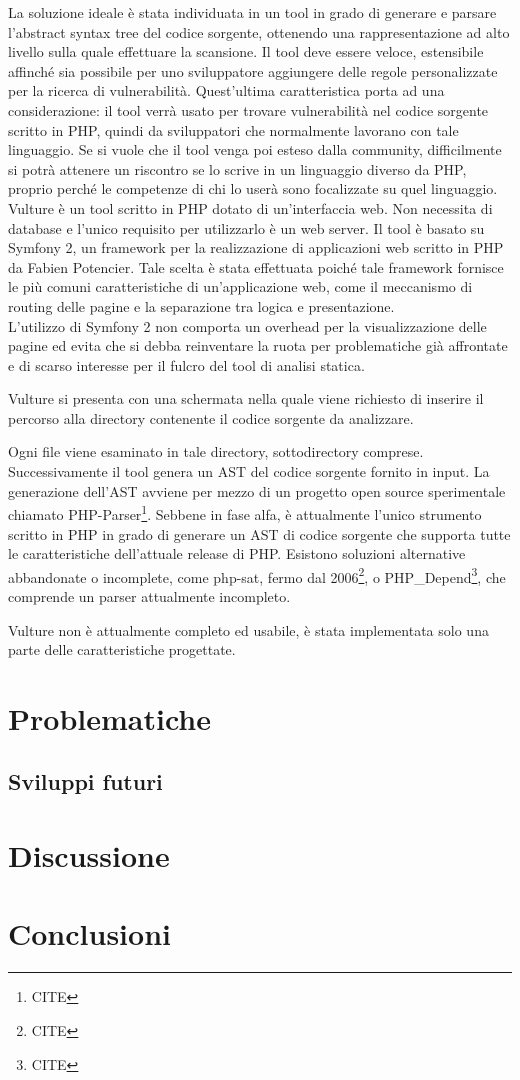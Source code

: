 La soluzione ideale è stata individuata in un tool in grado di generare e parsare l'abstract syntax tree del codice sorgente, ottenendo una rappresentazione ad alto livello sulla quale effettuare la scansione. Il tool deve essere veloce, estensibile affinché sia possibile per uno sviluppatore aggiungere delle regole personalizzate per la ricerca di vulnerabilità. Quest'ultima caratteristica porta ad una considerazione: il tool verrà usato per trovare vulnerabilità nel codice sorgente scritto in PHP, quindi da sviluppatori che normalmente lavorano con tale linguaggio. Se si vuole che il tool venga poi esteso dalla community, difficilmente si potrà attenere un riscontro se lo scrive in un linguaggio diverso da PHP, proprio perché le competenze di chi lo userà sono focalizzate su quel linguaggio.\\

Vulture è un tool scritto in PHP dotato di un'interfaccia web. Non necessita di database e l'unico requisito per utilizzarlo è un web server. Il tool è basato su Symfony 2, un framework per la realizzazione di applicazioni web scritto in PHP da Fabien Potencier. Tale scelta è stata effettuata poiché tale framework fornisce le più comuni caratteristiche di un'applicazione web, come il meccanismo di routing delle pagine e la separazione tra logica e presentazione.\\
L'utilizzo di Symfony 2 non comporta un overhead per la visualizzazione delle pagine ed evita che si debba reinventare la ruota per problematiche già affrontate e di scarso interesse per il fulcro del tool di analisi statica.

Vulture si presenta con una schermata nella quale viene richiesto di inserire il percorso alla directory contenente il codice sorgente da analizzare. 

\cite{IMMAGINE VULTURE INIZIALE}

Ogni file viene esaminato in tale directory, sottodirectory comprese.\\
Successivamente il tool genera un AST del codice sorgente fornito in input. La generazione dell'AST avviene per mezzo di un progetto open source sperimentale chiamato PHP-Parser\footnote{CITE}. Sebbene in fase alfa, è attualmente l'unico strumento scritto in PHP in grado di generare un AST di codice sorgente che supporta tutte le caratteristiche dell'attuale release di PHP. Esistono soluzioni alternative abbandonate o incomplete, come php-sat, fermo dal 2006\footnote{CITE}, o PHP\_Depend\footnote{CITE}, che comprende un parser attualmente incompleto.

Vulture non è attualmente completo ed usabile, è stata implementata solo una parte delle caratteristiche progettate.


\chapter{Problematiche}


\section{Sviluppi futuri}

\chapter{Discussione}

\chapter{Conclusioni}